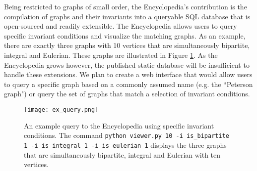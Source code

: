 \documentclass[12pt]{article}
\begin{document}
Being restricted to graphs of small order, the Encyclopedia's contribution is the compilation of graphs and their invariants into a queryable SQL database that is open-sourced and readily extensible. 
The Encyclopedia allows users to query specific invariant conditions and visualize the matching graphs.
As an example, there are exactly three graphs with 10 vertices that are simultaneously bipartite, integral and Eulerian. 
These graphs are illustrated in Figure \ref{fig:examplequery}.
As the Encyclopedia grows however, the published static database will be insufficient to handle these extensions.
We plan to create a web interface that would allow users to query a specific graph based on a commonly assumed name (e.g. the ``Peterson graph") or query the set of graphs that match a selection of invariant conditions.

\begin{figure}[p]
\begin{center}
  \texttt{[image: ex\_query.png]}
\end{center}
  \caption{
    An example query to the Encyclopedia using specific invariant conditions. 
    The command \texttt{python viewer.py 10 -i is\_bipartite 1 -i is\_integral 1 -i is\_eulerian 1} displays the three graphs that are simultaneously bipartite, integral and Eulerian with ten vertices. 
  }
  \label{fig:examplequery}
\end{figure}


\clearpage %






\newpage %
\end{document}
